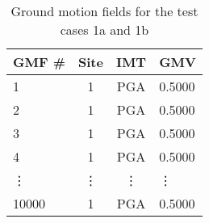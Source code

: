 \begin{table}[htbp]

\centering
\begin{tabular}{ l c c l }

\hline
\rowcolor{anti-flashwhite}
\bf{GMF \#} & \bf{Site} & \bf{IMT} & \bf{GMV}\\
\hline
1 & 1 & PGA & 0.5000 \\
2 & 1 & PGA & 0.5000 \\
3 & 1 & PGA & 0.5000 \\
4 & 1 & PGA & 0.5000 \\
\vdots & \vdots & \vdots & \vdots \\
10000 & 1 & PGA & 0.5000 \\
\hline
\end{tabular}

\caption{Ground motion fields for the test cases 1a and 1b}
\label{tab:scenario-gmfs-identical}
\end{table}